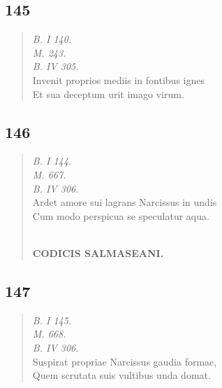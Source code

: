 \documentclass[11pt, a4paper]{report}
\begin{document}
            \subsection*{145}
      \begin{verse}
      \textit{B. I 140.} \\ \textit{M. 243.} \\ \textit{B. IV 305.} \\ Invenit proprios mediis in fontibus ignes \\ Et sua deceptum urit imago virum. \\ 
      \end{verse}
  
            \subsection*{146}
      \begin{verse}
      \textit{B. I 144.} \\ \textit{M. 667.} \\ \textit{B. IV 306.} \\ Ardet amore sui lagrans Narcissus in undis \\ Cum modo perspicua se speculatur aqua. \\ 
        ﻿\pagebreak 
    \begin{center} \textbf{CODICIS SALMASEANI.} \end{center} \marginpar{[143]} 
      \end{verse}
  
            \subsection*{147}
      \begin{verse}
      \textit{B. I 145.} \\ \textit{M. 668.} \\ \textit{B. IV 306.} \\ Suspirat propriae Narcissus gaudia formae, \\ Quem scrutata suis vultibus unda domat. \\ 
      \end{verse}
  
\end{document}
